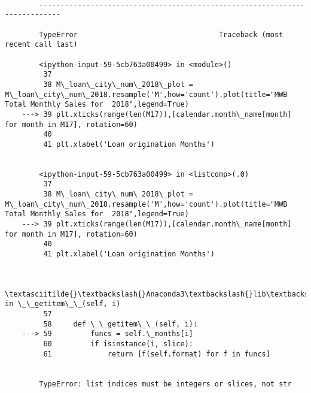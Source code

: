 \documentclass[11pt]{article}
\begin{document}
\begin{Verbatim}[commandchars=\\\{\}]
    \end{Verbatim}

    \begin{Verbatim}[commandchars=\\\{\}]

        ---------------------------------------------------------------------------

        TypeError                                 Traceback (most recent call last)

        <ipython-input-59-5cb763a00499> in <module>()
         37 
         38 M\_loan\_city\_num\_2018\_plot = M\_loan\_city\_num\_2018.resample('M',how='count').plot(title="MWB Total Monthly Sales for  2018",legend=True)
    ---> 39 plt.xticks(range(len(M17)),[calendar.month\_name[month] for month in M17], rotation=60)
         40 
         41 plt.xlabel('Loan origination Months')
    

        <ipython-input-59-5cb763a00499> in <listcomp>(.0)
         37 
         38 M\_loan\_city\_num\_2018\_plot = M\_loan\_city\_num\_2018.resample('M',how='count').plot(title="MWB Total Monthly Sales for  2018",legend=True)
    ---> 39 plt.xticks(range(len(M17)),[calendar.month\_name[month] for month in M17], rotation=60)
         40 
         41 plt.xlabel('Loan origination Months')
    

        \textasciitilde{}\textbackslash{}Anaconda3\textbackslash{}lib\textbackslash{}calendar.py in \_\_getitem\_\_(self, i)
         57 
         58     def \_\_getitem\_\_(self, i):
    ---> 59         funcs = self.\_months[i]
         60         if isinstance(i, slice):
         61             return [f(self.format) for f in funcs]
    

        TypeError: list indices must be integers or slices, not str

    \end{Verbatim}

    \begin{center}
    \end{center}
    { \hspace*{\fill} \\}
    
    \begin{center}
    \end{center}
    { \hspace*{\fill} \\}
    
\end{document}
